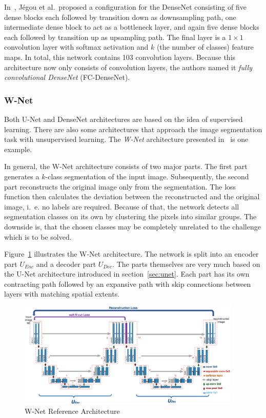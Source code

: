 In~\cite{denseseg17}, Jégou et al.\ proposed a configuration for the DenseNet consisting of five dense blocks each followed by transition down as downsampling path, one intermediate dense block to act as a bottleneck layer, and again five dense blocks each followed by transition up as upsampling path. The final layer is a $1\times 1$ convolution layer with softmax activation and $k$ (the number of classes) feature maps. In total, this network contains 103 convolution layers. Because this architecture now only consists of convolution layers, the authors named it \emph{fully convolutional DenseNet} (FC-DenseNet).

\subsubsection{W-Net}
\label{sec:w-net}
Both U-Net and DenseNet architectures are based on the idea of supervised learning. There are also some architectures that approach the image segmentation task with unsupervised learning. The \emph{W-Net} architecture presented in~\cite{wnet17} is one example.

In general, the W-Net architecture consists of two major parts. The first part generates a $k$-class segmentation of the input image. Subsequently, the second part reconstructs the original image only from the segmentation. The loss function then calculates the deviation between the reconstructed and the original image, i.~e. no labels are required. Because of that, the network detects all segmentation classes on its own by clustering the pixels into similar groups. The downside is, that the chosen classes may be completely unrelated to the challenge which is to be solved.

Figure~\ref{fig:wnet_architecture} illustrates the W-Net architecture. The network is split into an encoder part $U_{Enc}$ and a decoder part $U_{Dec}$. The parts themselves are very much based on the U-Net architecture introduced in section~\ref{sec:unet}. Each part has its own contracting path followed by an expansive path with skip connections between layers with matching spatial extents.

\begin{figure}[h]
    \centering
    \includegraphics[width=0.95\textwidth]{images/w-net-architecture}
    \caption[W-Net Reference Architecture]{W-Net Reference Architecture~\cite{wnet17}}
    \label{fig:wnet_architecture}
\end{figure}

